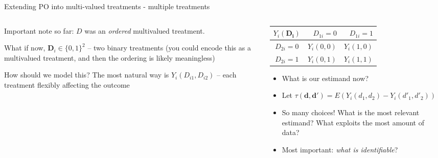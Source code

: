\documentclass[notes,11pt, aspectratio=169]{beamer}
\newenvironment{wideitemize}{\itemize\addtolength{\itemsep}{10pt}}{\enditemize}
\begin{document}
\begin{frame}{Extending PO into multi-valued treatments - multiple treatments}
\begin{columns}[T] %
  \begin{column}{.6\textwidth}
    \begin{wideitemize}
    \item Important note so far: $D$ was an \emph{ordered} multivalued
      treatment.
    \item What if now, $\mathbf{D}_{i} \in \{0,1\}^{2}$ -- two binary
      treatments (you could encode this as a multivalued treatment,
      and then the ordering is likely meaningless)
    \item How should we model this? The most natural way is
      $Y_{i}(D_{i1}, D_{i2})$ -- each treatment flexibly affecting the
      outcome
\end{wideitemize}    

\end{column}%
  \hfill%
  \begin{column}{.4\textwidth}
    \begin{tabular}{c|rr}
      $ Y_{i}(\mathbf{D_{i}})$ & $D_{1i} = 0$ & $D_{1i} = 1$\\
      \midrule
      $D_{2i} = 0$ & $Y_{i}(0,0)$ & $Y_{i}(1,0)$\\
      $D_{2i} = 1$ & $Y_{i}(0,1)$ & $Y_{i}(1,1)$\\
    \end{tabular}
    
    \begin{itemize}
    \item  What is our estimand now?
    \item Let $\tau(\mathbf{d}, \mathbf{d}') = E(Y_{i}(d_{1},d_{2}) - Y_{i}(d'_{1},d'_{2})) $
    \item So many choices! What is the most relevant estimand? What
      exploits the most amount of data?
    \item Most important: \emph{what is identifiable}?
    \end{itemize}
  \end{column}
\end{columns}
\end{frame}
\end{document}
